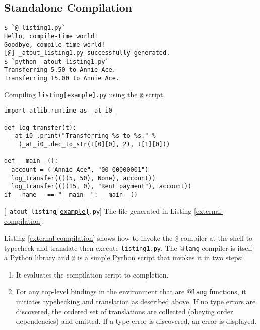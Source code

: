 \documentclass[9pt]{sigplanconf}
\newcommand{\lstinlinep}[1]{\lstinline[language=Python,basicstyle=\ttfamily\small,deletendkeywords={tuple,buffer,map}]{#1}}
\begin{document}
\subsection{Standalone Compilation}\label{compilation} 
\begin{codelisting}[t]
\begin{lstlisting}[style=Bash]
$ `@ listing1.py`
Hello, compile-time world!
Goodbye, compile-time world!
[@] _atout_listing1.py successfully generated.
$ `python _atout_listing1.py`
Transferring 5.50 to Annie Ace.
Transferring 15.00 to Annie Ace.
\end{lstlisting}
\caption{Compiling \texttt{listing\ref{example}.py} using the \texttt{@} script.}
\label{external-compilation}
\end{codelisting}
\begin{codelisting}[t]
\begin{lstlisting}
import atlib.runtime as _at_i0_

def log_transfer(t):
  _at_i0_.print("Transferring %s to %s." % 
    (_at_i0_.dec_to_str(t[0][0], 2), t[1][0]))

def __main__():
  account = ("Annie Ace", "00-00000001")
  log_transfer((((5, 50), None), account))
  log_transfer((((15, 0), "Rent payment"), account))
if __name__ == "__main__": __main__()
\end{lstlisting}
\caption{[\texttt{\_atout\_listing\ref{example}.py}] The file generated in Listing \ref{external-compilation}.}
\label{example-out}
\end{codelisting}


Listing \ref{external-compilation} shows how to invoke the \lstinlinep{@} compiler at the shell to typecheck and translate then execute \lstinlinep{listing1.py}. %
The @\texttt{lang} compiler is itself a Python library and \lstinlinep{@} is a simple Python script that invokes it in two steps:
\begin{enumerate}
\item It evaluates the compilation script to completion.
\item For any top-level bindings in the environment that are @\texttt{lang} functions, it initiates typehecking and translation as described above. If no type errors are discovered, the ordered set of translations are collected (obeying order dependencies) and emitted. If a type error is discovered, an error is displayed.
\end{enumerate}
\end{document}
